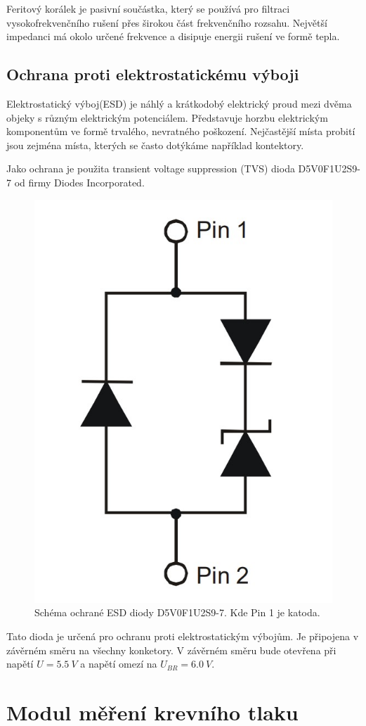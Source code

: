 Feritový korálek je pasivní součástka, který se používá pro filtraci vysokofrekvenčního rušení přes širokou část frekvenčního rozsahu. Největší impedanci má okolo určené frekvence a disipuje energii rušení ve formě tepla.
\subsection{Ochrana proti elektrostatickému výboji}
Elektrostatický výboj(ESD) je náhlý a krátkodobý elektrický proud mezi dvěma objeky s různým elektrickým potenciálem. Představuje horzbu elektrickým komponentům ve formě trvalého, nevratného poškození. Nejčastější místa probití jsou zejména místa, kterých se často dotýkáme například kontektory.
\par
Jako ochrana je použita transient voltage suppression (TVS) dioda D5V0F1U2S9-7 od firmy Diodes Incorporated.

\begin{figure}[H]
    \centering
    \includegraphics[width=0.4\linewidth]{pictures/esd_diode_schema.jpg}
    \caption{Schéma ochrané ESD diody D5V0F1U2S9-7. Kde Pin 1 je katoda. \cite{cite:ESD}}
    \label{fig:esd_diode}
\end{figure}

Tato dioda je určená pro ochranu proti elektrostatickým výbojům. Je připojena v závěrném směru na všechny konketory. V závěrném směru bude otevřena při napětí
$U = 5.5 \ V $ a napětí omezí na $U_{BR} = 6.0 \ V $.

\section{Modul měření krevního tlaku}

